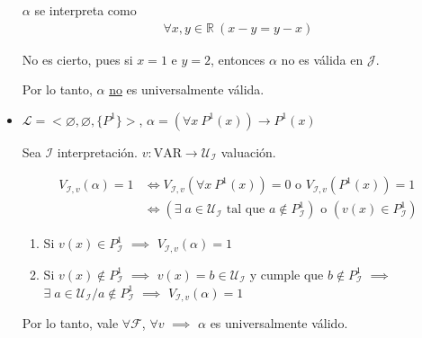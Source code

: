 \begin{itemize}
            $\alpha$ se interpreta como
            \begin{gather*}
                \forall x, y \in \mathbb{R} ~ (x - y = y - x)
            \end{gather*}

            No es cierto, pues si $x = 1$ e $y = 2$, entonces $\alpha$ no es
            válida en $\mathcal{J}$.

            Por lo tanto, $\alpha$ \underline{no} es universalmente válida.

        \item $\mathcal{L} = <\varnothing, \varnothing, \{ P^1 \}>$,
            $\alpha = (\forall x ~ P^1(x)) \to P^1(x)$

            Sea $\mathcal{I}$ interpretación. 
            $v: \mathrm{VAR} \to \mathcal{U}_{\mathcal{I}}$ valuación.

            \begin{align*}
                V_{\mathcal{I}, v}(\alpha) = 1 &\iff
                V_{\mathcal{I}, v}(\forall x ~ P^1(x)) = 0 
                \text{ o }
                V_{\mathcal{I}, v}(P^1(x)) = 1 \\
                &\iff \left(\exists \; a \in \mathcal{U}_{\mathcal{I}} 
                    \text{ tal que } a \notin P^1_{\mathcal{I}}\right)
                \text{ o }
                \left(v(x) \in P^1_{\mathcal{I}}\right)
            \end{align*}

            \begin{enumerate}[%
                            labelindent=*,
                            style=multiline,
                            leftmargin=*,
                            align=left,
                            leftmargin=2\parindent,
                            label=Caso \arabic*)]
                \item Si $v(x) \in P^1_{\mathcal{I}}$
                    $\implies$
                    $V_{\mathcal{I}, v}(\alpha) = 1$
                \item Si $v(x) \notin P^1_{\mathcal{I}}$
                    $\implies$
                    $v(x) = b \in \mathcal{U}_{\mathcal{I}}$ y cumple que
                    $b \notin P^1_{\mathcal{I}}$
                    $\implies$
                    $\exists \; a \in \mathcal{U}_{\mathcal{I}} / 
                    a \notin P^1_{\mathcal{I}}$
                    $\implies$
                    $V_{\mathcal{I}, v}(\alpha) = 1$
            \end{enumerate}
            
            Por lo tanto, vale $\forall \mathcal{F}$, $\forall v$
            $\implies$
            $\alpha$ es universalmente válido.
    \end{itemize}

